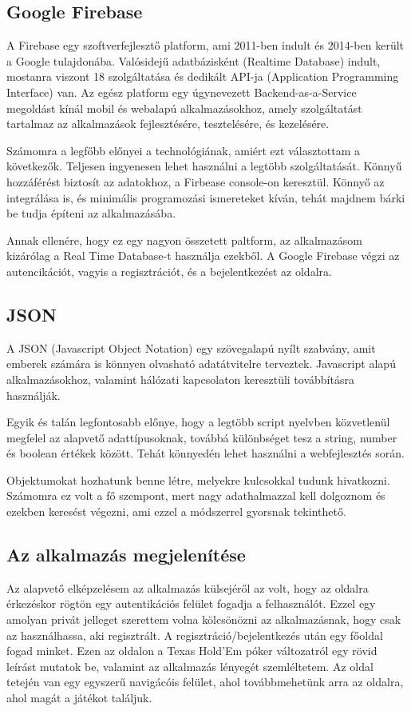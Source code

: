 \subsection{Google Firebase}
A Firebase egy szoftverfejlesztő platform, ami 2011-ben indult és 2014-ben került a Google tulajdonába. Valósidejű adatbázisként (Realtime Database) indult, mostanra viszont 18 szolgáltatása és dedikált API-ja (Application Programming Interface) van. Az egész platform egy úgynevezett Backend-as-a-Service megoldást kínál mobil és webalapú alkalmazásokhoz, amely szolgáltatást tartalmaz az alkalmazások fejlesztésére, tesztelésére, és kezelésére. 

Számomra a legfőbb előnyei a technológiának, amiért ezt választottam a következők. Teljesen ingyenesen lehet használni a legtöbb szolgáltatását. Könnyű hozzáférést biztosít az adatokhoz, a Firbease console-on keresztül. Könnyő az integrálása is, és minimális programozási ismereteket kíván, tehát majdnem bárki be tudja építeni az alkalmazásába.

Annak ellenére, hogy ez egy nagyon összetett paltform, az alkalmazásom kizárólag a Real Time Database-t használja ezekből. A Google Firebase végzi az autencikációt, vagyis a regisztrációt, és a bejelentkezést az oldalra.
\cite{firebase}

\subsection{JSON}
A JSON (Javascript Object Notation) egy szövegalapú nyílt szabvány, amit emberek számára is könnyen olvasható adatátvitelre terveztek. Javascript alapú alkalmazásokhoz, valamint hálózati kapcsolaton keresztüli továbbításra használják. 

Egyik és talán legfontosabb előnye, hogy a legtöbb script nyelvben közvetlenül megfelel az alapvető adattípusoknak, továbbá különbséget tesz a string, number és boolean értékek között. Tehát könnyedén lehet használni a webfejlesztés során. 

Objektumokat hozhatunk benne létre, melyekre kulcsokkal tudunk hivatkozni. Számomra ez volt a fő szempont, mert nagy adathalmazzal kell dolgoznom és ezekben keresést végezni, ami ezzel a módszerrel gyorsnak tekinthető.


\subsection{Az alkalmazás megjelenítése}
Az alapvető elképzelésem az alkalmazás külsejéről az volt, hogy az oldalra érkezéskor rögtön egy autentikációs felület fogadja a felhasználót. Ezzel egy amolyan privát jelleget szerettem volna kölcsönözni az alkalmazásnak, hogy csak az használhassa, aki regisztrált. A regisztráció/bejelentkezés után egy főoldal fogad minket. Ezen az oldalon a Texas Hold'Em póker változatról egy rövid leírást mutatok be, valamint az alkalmazás lényegét szemléltetem. Az oldal tetején van egy egyszerű navigácóis felület, ahol továbbmehetünk arra az oldalra, ahol magát a játékot találjuk.

